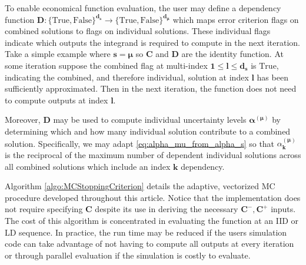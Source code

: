 \documentclass[graybox]{svmult}
\begin{document}
To enable economical function evaluation, the user may define a dependency function $\boldsymbol{D}: \{\text{True},\text{False}\}^{\boldsymbol{d}_{\boldsymbol{s}}} \to \{\text{True},\text{False}\}^{\boldsymbol{d}_{\boldsymbol{\mu}}}$ which maps error criterion flags on combined solutions to flags on individual solutions. These individual flags indicate which outputs the integrand is required to compute in the next iteration. Take a simple example where  $\boldsymbol{s}=\boldsymbol{\mu}$ so $\boldsymbol{C}$ and $\boldsymbol{D}$ are the identity function. At some iteration suppose the combined flag at multi-index $\boldsymbol{1} \leq \boldsymbol{l} \leq \boldsymbol{d}_{\boldsymbol{s}}$ is $\text{True}$, indicating the combined, and therefore individual, solution at index $\boldsymbol{l}$ has been sufficiently approximated. Then in the next iteration, the function does not need to compute outputs at index $\boldsymbol{l}$.

Moreover, $\boldsymbol{D}$ may be used to compute individual uncertainty levels $\boldsymbol{\alpha}^{(\boldsymbol{\mu})}$ by determining which and how many individual solution contribute to a combined solution. Specifically, we may adapt \eqref{eq:alpha_mu_from_alpha_s} so that 
$\alpha_{\boldsymbol{k}}^{(\boldsymbol{\mu})}$ is the reciprocal of the maximum number of dependent individual solutions across all combined solutions which include an index $\boldsymbol{k}$ dependency.

Algorithm \ref{algo:MCStoppingCriterion} details the adaptive, vectorized MC procedure developed throughout this article. Notice that the implementation does not require specifying $\boldsymbol{C}$ despite its use in deriving the necessary $\boldsymbol{C}^-,\boldsymbol{C}^+$ inputs. The cost of this algorithm is concentrated in evaluating the function at an IID or LD sequence. In practice, the run time may be reduced if the users simulation code can take advantage of not having to compute all outputs at every iteration or through parallel evaluation if the simulation is costly to evaluate.
\end{document}
